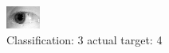 \begin{figure}[h!]
\begin{center}
\includegraphics[width=0.60\columnwidth]{figures/ID1230_class_3_target_4.png}
\end{center}
\caption{ Classification: 3 actual target: 4}
\label{fig:ID1230_class_3_target_4}
\end{figure}
